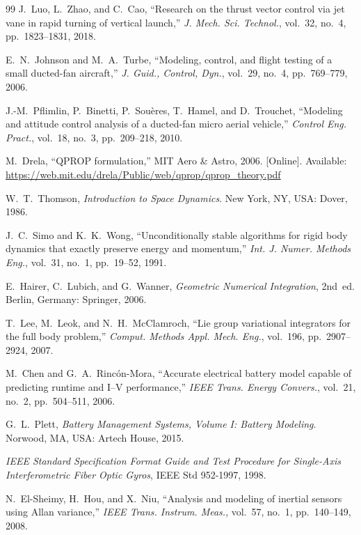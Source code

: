 \documentclass[journal]{IEEEtran}
\begin{document}
\begin{thebibliography}{99}
J.~Luo, L.~Zhao, and C.~Cao, ``Research on the thrust vector control via jet vane in rapid turning of vertical launch,'' \textit{J. Mech. Sci. Technol.}, vol.~32, no.~4, pp.~1823--1831, 2018.

E.~N.~Johnson and M.~A.~Turbe, ``Modeling, control, and flight testing of a small ducted-fan aircraft,'' \textit{J. Guid., Control, Dyn.}, vol.~29, no.~4, pp.~769--779, 2006.

J.-M.~Pflimlin, P.~Binetti, P.~Sou\`eres, T.~Hamel, and D.~Trouchet, ``Modeling and attitude control analysis of a ducted-fan micro aerial vehicle,'' \textit{Control Eng. Pract.}, vol.~18, no.~3, pp.~209--218, 2010.

M.~Drela, ``QPROP formulation,'' MIT Aero \& Astro, 2006. [Online]. Available: \url{https://web.mit.edu/drela/Public/web/qprop/qprop_theory.pdf}

W.~T.~Thomson, \textit{Introduction to Space Dynamics}. New York, NY, USA: Dover, 1986.

J.~C.~Simo and K.~K.~Wong, ``Unconditionally stable algorithms for rigid body dynamics that exactly preserve energy and momentum,'' \textit{Int. J. Numer. Methods Eng.}, vol.~31, no.~1, pp.~19--52, 1991.

E.~Hairer, C.~Lubich, and G.~Wanner, \textit{Geometric Numerical Integration}, 2nd~ed. Berlin, Germany: Springer, 2006.

T.~Lee, M.~Leok, and N.~H.~McClamroch, ``Lie group variational integrators for the full body problem,'' \textit{Comput. Methods Appl. Mech. Eng.}, vol.~196, pp.~2907--2924, 2007.

M.~Chen and G.~A.~Rinc\'on-Mora, ``Accurate electrical battery model capable of predicting runtime and I--V performance,'' \textit{IEEE Trans. Energy Convers.}, vol.~21, no.~2, pp.~504--511, 2006.

G.~L.~Plett, \textit{Battery Management Systems, Volume I: Battery Modeling}. Norwood, MA, USA: Artech House, 2015.

\textit{IEEE Standard Specification Format Guide and Test Procedure for Single-Axis Interferometric Fiber Optic Gyros}, IEEE Std 952-1997, 1998.

N.~El-Sheimy, H.~Hou, and X.~Niu, ``Analysis and modeling of inertial sensors using Allan variance,'' \textit{IEEE Trans. Instrum. Meas.}, vol.~57, no.~1, pp.~140--149, 2008.


\end{thebibliography}
\end{document}
